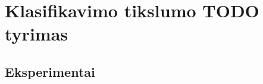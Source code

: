 \section{Klasifikavimo tikslumo TODO tyrimas}\label{sec:experiments}



\clearpage
\subsection{Eksperimentai}

\clearpage

\clearpage
